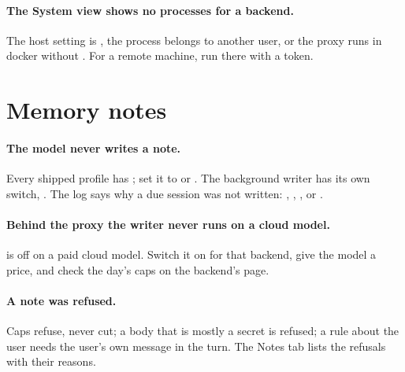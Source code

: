 \paragraph{The System view shows no processes for a backend.} The host setting is , the process belongs to another user, or the proxy runs in docker without . For a remote machine, run  there with a token.

\section{Memory notes}

\paragraph{The model never writes a note.} Every shipped profile has ; set it to  or . The background writer has its own switch, . The log says why a due session was not written: , , ,  or .

\paragraph{Behind the proxy the writer never runs on a cloud model.}  is off on a paid cloud model. Switch it on for that backend, give the model a price, and check the day's caps on the backend's page.

\paragraph{A note was refused.} Caps refuse, never cut; a body that is mostly a secret is refused; a rule about the user needs the user's own message in the turn. The Notes tab lists the refusals with their reasons.
